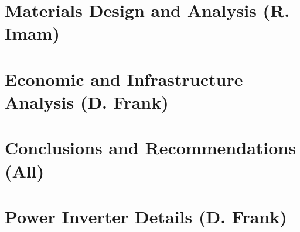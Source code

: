 \documentclass[12pt]{article}
\numberwithin{equation}{section}
\begin{document}
\clearpage

\section{Materials Design and Analysis (R. Imam)}
\label{sec:Materials}


\clearpage

\section{Economic and Infrastructure Analysis (D. Frank)}


\clearpage

\section{Conclusions and Recommendations (All)}


\clearpage
\newpage



\printbibliography


\clearpage

\appendix
\vspace{-1em}



\section{Power Inverter Details (D. Frank)}
\label{sec:app_pi}

\end{document}
